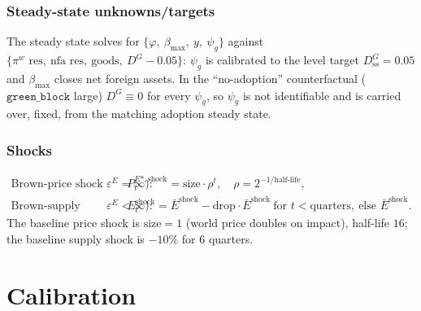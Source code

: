 \documentclass[11pt,a4paper]{article}
\newcommand{\stst}{\mathrm{ss}}
\newcommand{\DG}{D^{G}}
\begin{document}
\subsubsection{Steady-state unknowns/targets}

The steady state solves for $\{\varphi,\ \beta_{\max},\ y,\ \psi_g\}$ against
$\{\pi^{w}\text{ res},\ \mathrm{nfa}\text{ res},\ \text{goods},\ \DG-0.05\}$: $\psi_g$
is calibrated to the level target $\DG_{\stst}=0.05$ and $\beta_{\max}$ closes net
foreign assets. In the ``no-adoption'' counterfactual ($\texttt{green\_block}$
large) $\DG\equiv 0$ for every $\psi_g$, so $\psi_g$ is not identifiable and is
carried over, fixed, from the matching adoption steady state.

\subsubsection{Shocks}

\begin{align}
\text{Brown-price shock (requires }\varepsilon^{E}=\infty):&\quad
P^{E*,\text{shock}}_t=\text{size}\cdot\rho^{t},\quad \rho=2^{-1/\text{half-life}},\\
\text{Brown-supply shock (requires }\varepsilon^{E}<\infty):&\quad
E^{\text{shock}}_t=\bar E^{\text{shock}}-\text{drop}\cdot\bar E^{\text{shock}}\ \text{for }t<\text{quarters},\ \text{else }\bar E^{\text{shock}} .
\end{align}
The baseline price shock is $\text{size}=1$ (world price doubles on impact),
half-life $16$; the baseline supply shock is $-10\%$ for $6$ quarters.

\section{Calibration}\label{sec:cal}
\end{document}
